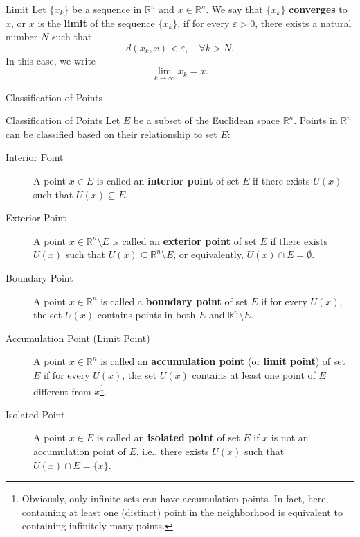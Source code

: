 \begin{definition}{Limit}
    Let \(\{x_k\}\) be a sequence in \(\mathbb{R}^n\) and \(x \in \mathbb{R}^n\). 
    We say that \(\{x_k\}\) \textbf{converges} to \(x\), or \(x\) is the \textbf{limit} of the sequence \(\{x_k\}\), 
    if for every \(\varepsilon > 0\), there exists a natural number \(N\) such that
    \[
        d(x_k, x) < \varepsilon, \quad \forall k > N.
    \]
    In this case, we write
    \[
        \lim_{k \to \infty} x_k = x.
    \]
\end{definition}

\begin{leftbarTitle}{Classification of Points}\end{leftbarTitle} %
\begin{definition}{Classification of Points} %
    Let \(E\) be a subset of the Euclidean space \(\mathbb{R}^n\).
    Points in \(\mathbb{R}^n\) can be classified based on their relationship to set \(E\):
    \begin{description}
        \item[Interior Point] A point \(x \in E\) is called an \textbf{interior point} of set \(E\) 
            if there exists \(U(x)\) such that \(U(x) \subseteq E\).
        \item[Exterior Point] A point \(x \in \mathbb{R}^n \setminus E\) is called an \textbf{exterior point} of set \(E\) 
            if there exists \(U(x)\) such that \(U(x) \subseteq \mathbb{R}^n \setminus E \), or equivalently, 
            \(U(x) \cap E = \emptyset\).
        \item[Boundary Point] A point \(x \in \mathbb{R}^n\) is called a \textbf{boundary point} of set \(E\) 
            if for every \(U(x)\), the set \(U(x)\) contains points in both \(E\) and \(\mathbb{R}^n \setminus E\).
        \item[Accumulation Point (Limit Point)] A point \(x \in \mathbb{R}^n\) is called an 
            \textbf{accumulation point} (or \textbf{limit point}) of set \(E\) if for every \(U(x)\), 
            the set \(U(x)\) contains at least one point of \(E\) different from \(x\)\footnote{
                Obviously, only infinite sets can have accumulation points.
                In fact, here, containing at least one (distinct) point in the neighborhood is equivalent to 
                containing infinitely many points.
            }.
        \item[Isolated Point] A point \(x \in E\) is called an \textbf{isolated point} of set \(E\) 
            if \(x\) is not an accumulation point of \(E\), i.e., there exists \(U(x)\) such that
            \(U(x) \cap E = \{x\}\).
    \end{description}
\end{definition}

